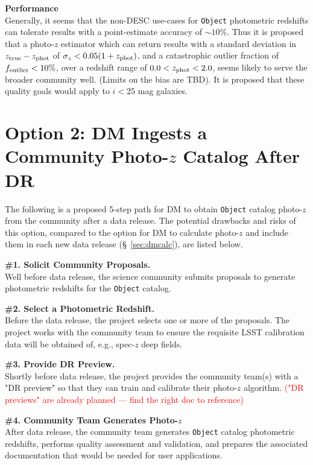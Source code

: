 \documentclass[DM,lsstdraft,toc]{lsstdoc}
\begin{document}
{\bf Performance}\\
Generally, it seems that the non-DESC use-cases for {\tt Object} photometric redshifts can tolerate results with a point-estimate accuracy of $\sim10\%$.
Thus it is proposed that a photo-$z$ estimator which can return results with a standard deviation in $z_{\rm true}-z_{\rm phot}$ of $\sigma_z < 0.05(1+z_{\rm phot})$, and a catastrophic outlier fraction of $f_{\rm outlier} < 10\%$, over a redshift range of $0.0 < z_{\rm phot} < 2.0$, seems likely to serve the broader community well.
(Limits on the bias are TBD).
It is proposed that these quality goals would apply to $i<25$ mag galaxies.






\clearpage
\section{Option 2: DM Ingests a Community Photo-$z$ Catalog After DR}\label{sec:dmingest}

The following is a proposed 5-step path for DM to obtain {\tt Object} catalog photo-$z$ from the community after a data release. The potential drawbacks and risks of this option, compared to the option for DM to calculate photo-$z$ and include them in each new data release (\S~\ref{sec:dmcalc}), are listed below.

{\bf \#1. Solicit Community Proposals.}\\
Well before data release, the science community submits proposals to generate photometric redshifts for the {\tt Object} catalog.

{\bf \#2. Select a Photometric Redshift.}\\
Before the data release, the project selects one or more of the proposals. 
The project works with the community team to ensure the requisite LSST calibration data will be obtained of, e.g., spec-$z$ deep fields.

{\bf \#3. Provide DR Preview.}\\
Shortly before data release, the project provides the community team(s) with a "DR preview" so that they can train and calibrate their photo-$z$ algorithm. \textcolor{red}{("DR previews" are already planned --- find the right doc to reference)}

{\bf \#4. Community Team Generates Photo-$z$}\\
After data release, the community team generates {\tt Object} catalog photometric redshifts, performs quality assessment and validation, and prepares the associated documentation that would be needed for user applications.
\end{document}

